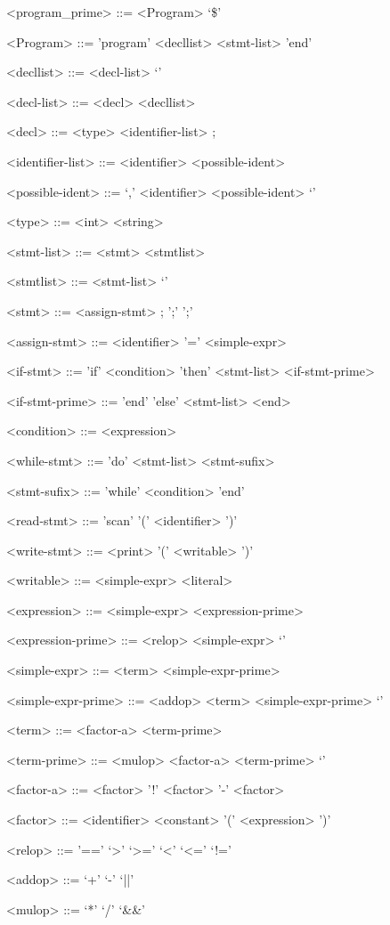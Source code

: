 \begin{numberedgrammar}

<program\_prime> ::= <Program> `\$' 

<Program> ::= 'program' <decllist> <stmt-list> 'end' 

<decllist> ::= <decl-list> 
\alt `\lambda' 
    
<decl-list> ::= <decl> <decllist>

<decl> ::= <type> <identifier-list> ;

<identifier-list> ::= <identifier> <possible-ident>

<possible-ident> ::= `,' <identifier> <possible-ident> 
\alt `\lambda' 

<type> ::= <int> 
\alt <string>

<stmt-list> ::= <stmt> <stmtlist>

<stmtlist> ::= <stmt-list> 
\alt `\lambda'

<stmt> ::=   <assign-stmt> ; 
 ';' 
 ';'
	
<assign-stmt> ::= <identifier> '=' <simple-expr>

<if-stmt> ::= 'if' <condition> 'then' <stmt-list> <if-stmt-prime>

<if-stmt-prime> ::=   'end' 
\alt 'else' <stmt-list> <end>
		 
<condition> ::= <expression>

<while-stmt> ::= 'do' <stmt-list> <stmt-sufix>

<stmt-sufix> ::= 'while' <condition> 'end'

<read-stmt> ::= 'scan' '(' <identifier> ')'

<write-stmt> ::= <print> '(' <writable> ')'

<writable> ::= <simple-expr> 
\alt <literal>

<expression> ::= <simple-expr> <expression-prime>

<expression-prime> ::= <relop> <simple-expr> 
\alt `\lambda'

<simple-expr> ::= <term> <simple-expr-prime>

<simple-expr-prime> ::= 	  <addop> <term> <simple-expr-prime> 
\alt `\lambda'

<term> ::= <factor-a> <term-prime>

<term-prime> ::=   <mulop> <factor-a> <term-prime> 
\alt `\lambda'

<factor-a> ::= <factor> 
\alt '!' <factor> 
\alt '-' <factor>

<factor> ::= <identifier> 
\alt <constant> 
\alt '(' <expression> ')'

<relop> ::= '==' 
\alt `>' 
\alt `>=' 
\alt `<' 
\alt `<=' 
\alt `!='

<addop> ::= `+' 
\alt `-' 
\alt `||'

<mulop> ::= `*' 
\alt `/' 
\alt `&&'

\end{numberedgrammar}


